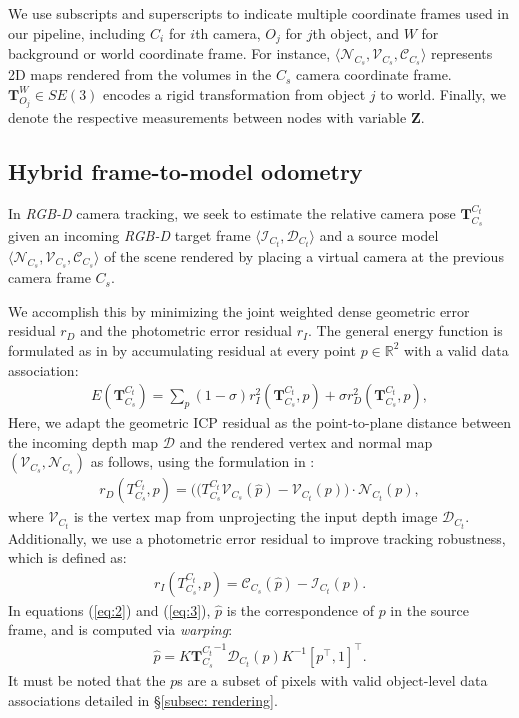 We use subscripts and superscripts to indicate multiple coordinate frames used in our pipeline, including $C_i$ for $i$th camera, $O_j$ for $j$th object, and $W$ for background or world coordinate frame. For instance,
\(\langle \mathcal{N}_{C_s}, \mathcal{V}_{C_s}, \mathcal{C}_{C_s} \rangle \) represents 2D maps rendered from the volumes in the $C_s$ camera coordinate frame.
$\mathbf{T}_{O_j}^W \in SE(3)$ encodes a rigid transformation from object $j$ to world. Finally, we denote the respective measurements between nodes with variable $\mathbf{Z}$.

\subsection{Hybrid frame-to-model odometry} \label{subsec: tracking}

In \textit{RGB-D} camera tracking, we seek to estimate the relative camera pose \(\mathbf{T}^{C_t}_{C_s}\) given an incoming \textit{RGB-D} target frame \( \langle \mathcal{I}_{C_t}, \mathcal{D}_{C_t}\rangle \) and a source model \( \langle \mathcal{N}_{C_{s}}, \mathcal{V}_{C_{s}}, \mathcal{C}_{C_{s}}\rangle \) of the scene rendered by placing a virtual camera at the previous camera frame ${C_s}$.

We accomplish this by minimizing the joint weighted dense geometric error residual $r_D$ and the photometric error residual $r_I$. The general energy function is formulated as in \cite{park_colored_2017} by accumulating residual at every point $p \in \mathbb{R}^2$ with a valid data association:
\begin{align}
    E(\mathbf{T}^{C_t}_{C_{s}}) = \sum_{p} (1 - \sigma) r_I^2(\mathbf{T}^{C_t}_{C_s}, p) + \sigma r_D^2(\mathbf{T}^{C_t}_{C_s}, p), \label{eq:1}
\end{align}
Here, we adapt the geometric ICP residual as the point-to-plane distance between the incoming depth map $\mathcal{D}$ and the rendered vertex and normal map $(\mathcal{V}_{C_s}, \mathcal{N}_{C_s})$ as follows, using the formulation in \cite{newcombeKinectFusionRealtimeDense2011}:
\begin{align}
    r_D(T^{C_t}_{C_s}, p) = \bigg((T^{C_t}_{C_{s}} \mathcal{V}_{C_s}( \hat{p} ) - \mathcal{V}_{C_{t}}(p )\bigg) \cdot \mathcal{N}_{C_{t}}( p ), \label{eq:2}
\end{align}
where $\mathcal{V}_{C_t}$ is the vertex map from unprojecting the input depth image $\mathcal{D}_{C_t}$.
Additionally, we use a photometric error residual to improve tracking robustness, which is defined as:
\begin{align}
    r_I(T^{C_t}_{C_s}, p) = \mathcal{C}_{C_s}(\hat{p}) - \mathcal{I}_{C_t}(p). \label{eq:3}
\end{align}
In equations (\ref{eq:2}) and (\ref{eq:3}), $\hat{p}$ is the correspondence of $p$ in the source frame, and is computed via \textit{warping}:
\begin{align}
    \hat{p} = K {\mathbf{T}^{C_t}_{C_s}}^{-1}\mathcal{D}_{C_t}(p)K^{-1}[p^\top, 1]^\top. \label{eq:4}
\end{align}
It must be noted that the $p$s are a subset of pixels with valid object-level data associations detailed in \S\ref{subsec: rendering}.

